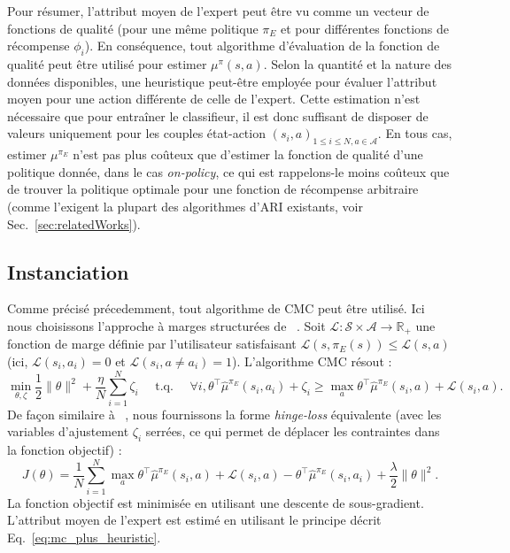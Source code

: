 \documentclass[english,utf8]{./hermes-journal}
\newcommand{\s}{\mathcal{S}}
\newcommand{\A}{\mathcal{A}}
\newcommand{\lc}{\mathcal{L}}
\begin{document}
Pour résumer, l'attribut moyen de l'expert peut être vu comme un vecteur de fonctions de qualité (pour une même politique  $\pi_E$ et pour différentes fonctions de récompense $\phi_i$). En conséquence, tout algorithme d'évaluation de la fonction de qualité peut être utilisé pour estimer $\mu^\pi(s,a)$.
Selon la quantité et la nature des données disponibles, une heuristique peut-être employée pour évaluer l'attribut moyen pour une action différente de celle de l'expert. Cette estimation n'est nécessaire que pour entraîner le classifieur, il est donc suffisant de disposer de valeurs uniquement pour les couples état-action $(s_i,a)_{1\leq i \leq N,a\in \A}$.
En tous cas, estimer  $\mu^{\pi_E}$ n'est pas plus coûteux que d'estimer la fonction de qualité d'une politique donnée, dans le cas \emph{on-policy}, ce qui est rappelons-le moins coûteux que de trouver la politique optimale pour une fonction de récompense arbitraire (comme l'exigent la plupart des algorithmes d'ARI existants, voir Sec.~\ref{sec:relatedWorks}).


\subsection{Instanciation}
\label{subsec:practicalApproach:instantiation}

Comme précisé précedemment, tout algorithme de CMC peut être utilisé. Ici nous choisissons l'approche à marges structurées de ~\cite{Taskar:2005}. Soit
$\lc:\s\times\A\rightarrow\mathbb{R}_+$ une fonction de marge définie par l'utilisateur satisfaisant $\lc(s,\pi_E(s))\leq \lc(s,a)$ (ici,
$\lc(s_i,a_i)=0$ et $\lc(s_i,a\neq a_i)=1$). L'algorithme CMC résout :%
\begin{equation}
  \min_{\theta,\zeta}\frac{1}{2}\|\theta\|^2 +
  \frac{\eta}{N}\sum_{i=1}^N \zeta_i \text{~~~~t.q.~~~~} \forall i,
  \theta^\top\hat{\mu}^{\pi_E}(s_i,a_i)+\zeta_i \geq \max_a \theta^\top
  \hat{\mu}^{\pi_E}(s_i,a) + \lc(s_i,a). \label{eq:qp_taskar}
\end{equation}
De façon similaire à ~\cite{Ratliff:2006}, nous fournissons la forme \emph{hinge-loss} équivalente (avec les variables d'ajustement $\zeta_i$ serrées, ce qui permet de déplacer les contraintes dans la fonction objectif) :
\begin{equation}
  J(\theta) = \frac{1}{N}\sum_{i=1}^N \max_a \theta^\top
  \hat{\mu}^{\pi_E}(s_i,a) + \lc(s_i,a) -
  \theta^\top\hat{\mu}^{\pi_E}(s_i,a_i) +
  \frac{\lambda}{2}\|\theta\|^2.
\end{equation}
La fonction objectif est minimisée en utilisant une descente de sous-gradient. L'attribut moyen de l'expert est estimé en utilisant le principe décrit Eq.~\eqref{eq:mc_plus_heuristic}.
\end{document}
